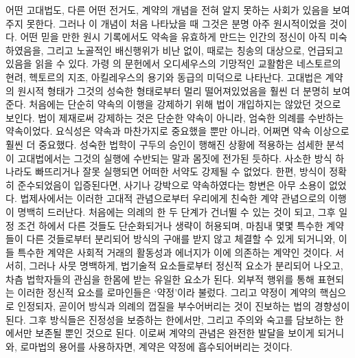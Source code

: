 어떤 고대법도, 다른 어떤 전거도,
계약의 개념을 전혀 알지 못하는 사회가 있음을 보여주지 못한다.
그러나 이 개념이 처음 나타났을 때
그것은 분명 아주 원시적이었을 것이다.
어떤 믿을 만한 원시 기록에서도
약속을 유효하게 만드는 인간의 정신이 아직 미숙하였음을,
그리고
노골적인 배신행위가 비난 없이, 때로는 칭송의 대상으로, 언급되고 있음을
읽을  수 있다.
가령 의 문헌에서
오디세우스의 기망적인 교활함은
네스토르의 현려, 헥토르의 지조,
아킬레우스의 용기와 동급의 미덕으로 나타난다.
고대법은 계약의 원시적 형태가 그것의 성숙한 형태로부터
멀리 떨어져있었음을 훨씬 더 분명히 보여준다.
처음에는 단순히 약속의 이행을 강제하기 위해
법이 개입하지는 않았던 것으로 보인다.
법이 제재로써 강제하는 것은 단순한 약속이 아니라,
엄숙한 의례를 수반하는 약속이었다.
요식성은 약속과 마찬가지로 중요했을 뿐만 아니라,
어쩌면 약속 이상으로 훨씬 더 중요했다.
성숙한 법학이 구두의 승인이 행해진 상황에 적용하는
섬세한 분석이
고대법에서는
그것의 실행에 수반되는 말과 몸짓에 전가된 듯하다.
사소한 방식 하나라도 빠뜨리거나 잘못 실행되면 어떠한 서약도
강제될 수 없었다.
한편, 방식이 정확히 준수되었음이 입증된다면,
사기나 강박으로 약속하였다는 항변은 아무 소용이 없었다.
법제사에서는
이러한 고대적 관념으로부터 우리에게 친숙한 계약 관념으로의 이행이
명백히 드러난다.
처음에는 의례의 한 두 단계가 건너뛸 수 있는 것이 되고,
그후 일정 조건 하에서 다른 것들도 단순화되거나 생략이 허용되며,
마침내 몇몇 특수한 계약들이 다른 것들로부터 분리되어
방식의 구애를 받지 않고 체결할 수 있게 되거니와,
이들 특수한 계약은
사회적 거래의 활동성과 에너지가
이에
의존하는 계약인 것이다.
서서히, 그러나 사뭇 명백하게,
법기술적 요소들로부터 정신적 요소가 분리되어 나오고,
차츰 법학자들의 관심을 한몸에 받는 유일한 요소가 된다.
외부적 행위를 통해 표현되는
이러한 정신적 요소를 로마인들은
`약정'이라 불렀다.
그리고 약정이 계약의 핵심으로 인정되자,
곧이어
방식과 의례의 껍질을 부수어버리는 것이
진보하는 법의 경향성이 된다.
그후 방식들은 진정성을 보증하는 한에서만,
그리고 주의와 숙고를 담보하는 한에서만
보존될 뿐인 것으로 된다.
이로써 계약의 관념은 완전한 발달을 보이게 되거니와,
로마법의 용어를 사용하자면,
계약은 약정에 흡수되어버리는 것이다.

